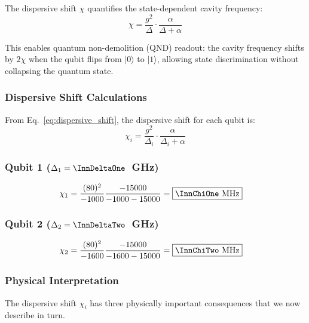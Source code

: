 The dispersive shift $\chi$ quantifies the state-dependent cavity frequency:
\begin{equation}
\chi = \frac{g^2}{\Delta} \cdot \frac{\alpha}{\Delta + \alpha}
\label{eq:dispersive_shift}
\end{equation}

This enables quantum non-demolition (QND) readout: the cavity frequency shifts by $2\chi$ when the qubit flips from $|0\rangle$ to $|1\rangle$, allowing state discrimination without collapsing the quantum state.


\subsubsection{Dispersive Shift Calculations}

From Eq.~\ref{eq:dispersive_shift}, the dispersive shift for each qubit is:
\begin{equation}
\chi_i = \frac{g^2}{\Delta_i} \cdot \frac{\alpha}{\Delta_i + \alpha}
\end{equation}

\subsubsection{Qubit 1 ($\Delta_1 = \InnDeltaOne$~GHz)}

\begin{align}
\chi_1 &= \frac{(80)^2}{-1000} \frac{-15000}{-1000 - 15000} = \boxed{\InnChiOne \text{ MHz}}
\end{align}

\subsubsection{Qubit 2 ($\Delta_2 = \InnDeltaTwo$~GHz)}

\begin{align}
\chi_2 &= \frac{(80)^2}{-1600} \frac{-15000}{-1600 - 15000} = \boxed{\InnChiTwo \text{ MHz}}
\end{align}

\subsubsection{Physical Interpretation}

The dispersive shift $\chi_i$ has three physically important consequences that we now
describe in turn.

